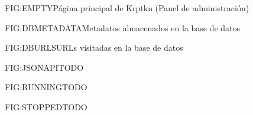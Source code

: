 \begin{figure}[emtpy]{FIG:EMPTY}{Página principal de Krptkn (Panel de administración)}
\end{figure}

\begin{figure}[dbmetadata]{FIG:DBMETADATA}{Metadatos almacenados en la base de datos}
\end{figure}

\begin{figure}[dburls]{FIG:DBURLS}{URLs visitadas en la base de datos}
\end{figure}

\begin{figure}[jsonapi]{FIG:JSONAPI}{TODO}
\end{figure}

\begin{figure}[running]{FIG:RUNNING}{TODO}
\end{figure}

\begin{figure}[stopped]{FIG:STOPPED}{TODO}
\end{figure}
